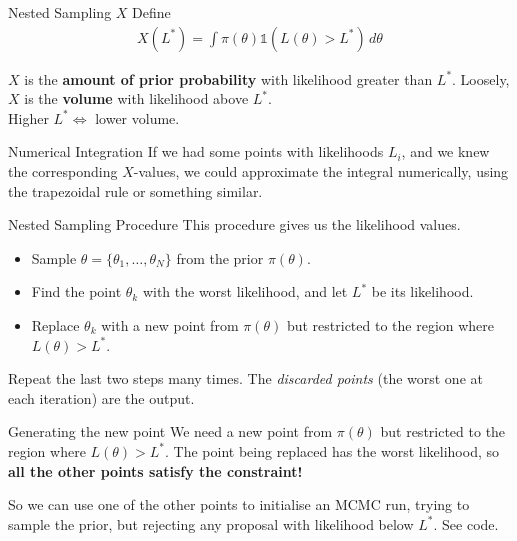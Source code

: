 \documentclass{beamer}
\begin{document}
\begin{frame}{Nested Sampling $X$}
\vspace{-20pt}
Define
\begin{eqnarray*}
X(L^*) = \int \pi(\theta) \mathds{1}\left(L(\theta) > L^*\right)\, d\theta
\end{eqnarray*}

\vspace{10pt}

\pause
$X$ is the {\bf amount of prior probability} with likelihood greater than $L^*$.
Loosely, $X$ is the {\bf volume} with likelihood above $L^*$.\\
Higher $L^* \Leftrightarrow$ lower volume.
\end{frame}
\begin{frame}{Numerical Integration}
If we had some points with likelihoods $L_i$, and we knew the corresponding
$X$-values, we could approximate the integral numerically, using the
trapezoidal rule or something similar.
\end{frame}
\begin{frame}{Nested Sampling Procedure}
This procedure gives us the likelihood values. \\

\begin{itemize}
	\item \pause Sample $\theta=\{\theta_{1}, \ldots , \theta_{N}\}$ from the prior $\pi(\theta)$.
	\item \pause Find the point $\theta_k$ with the worst
likelihood, and let $L^*$ be its likelihood.
	\item \pause Replace $\theta_{k}$ with a new point from $\pi(\theta)$ but restricted to the region where $L(\theta)>L^*$.
\end{itemize}

\pause Repeat the last two steps many times.
The \textit{discarded points} (the worst one at each iteration) are the output.
\end{frame}


\begin{frame}[t]{Generating the new point}
We need a new point from $\pi(\theta)$ but restricted to the region where $L(\theta)>L^*$. The point being replaced has the worst likelihood, so
{\bf all the other points satisfy the constraint!}
\vspace{20pt}

So we can use one of the other points to initialise an MCMC run, trying to
sample the prior, but rejecting any proposal with likelihood below $L^*$.
See code.
\end{frame}
\end{document}
